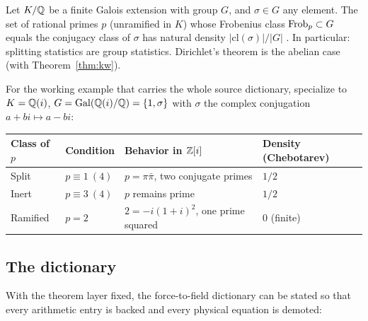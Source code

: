 \begin{theorem}\label{thm:chebotarev}
Let $K/\mathbb{Q}$ be a finite Galois extension with group $G$, and $\sigma\in G$ any element. The
set of rational primes $p$ (unramified in $K$) whose Frobenius class
$\operatorname{Frob}_{p}\subset G$ equals the conjugacy class of $\sigma$ has natural density
$|\mathrm{cl}(\sigma)|/|G|$ \cite{chebotarev1926}. In particular: splitting statistics are
group statistics. Dirichlet's theorem is the abelian case (with
Theorem~\ref{thm:kw}).
\end{theorem}

For the working example that carries the whole source dictionary, specialize to
$K=\mathbb{Q}(i)$, $G=\operatorname{Gal}(\mathbb{Q}(i)/\mathbb{Q})=\{1,\sigma\}$ with $\sigma$ the complex conjugation
$a+bi\mapsto a-bi$:

\begin{center}
\begin{tabular}{@{}llll@{}}
\toprule
Class of $p$ & Condition & Behavior in $\mathbb{Z}[i]$ & Density (Chebotarev)\\
\midrule
Split & $p\equiv1\ (4)$ & $p=\pi\bar\pi$, two conjugate primes & $1/2$\\
Inert & $p\equiv3\ (4)$ & $p$ remains prime & $1/2$\\
Ramified & $p=2$ & $2=-i(1+i)^{2}$, one prime squared & $0$ (finite)\\
\bottomrule
\end{tabular}
\end{center}

\subsection{The dictionary}

With the theorem layer fixed, the force-to-field dictionary can be stated so that
every arithmetic entry is backed and every physical equation is demoted:

